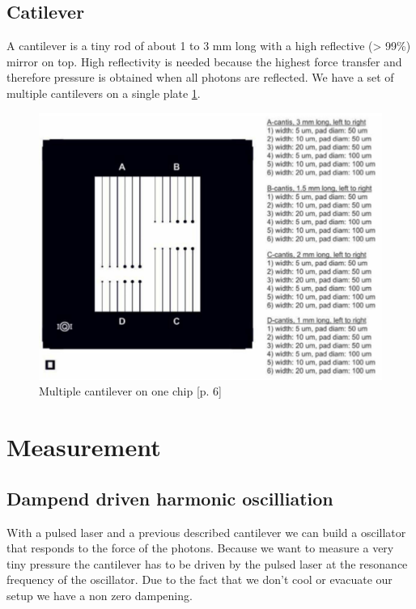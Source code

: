 \documentclass[12pt,a4paper]{article}
\begin{document}
\subsection{Catilever}
A cantilever is a tiny rod of about 1 to 3 mm long with a high reflective (> 99\%) mirror on top.
High reflectivity is needed because the highest force transfer and therefore pressure is obtained when all photons are reflected. We have a set of multiple cantilevers on a single plate \ref{fig:cantilever}.
\begin{figure}[H]
	\centering
	\includegraphics[scale=2]{../figures/cantilever.png}
	\caption{Multiple cantilever on one chip \cite{physikwiki}[p. 6]}
	\label{fig:cantilever}
\end{figure}





\pagebreak

\section{Measurement}
\subsection{Dampend driven harmonic oscilliation}
With a pulsed laser and a previous described cantilever we can build a oscillator that responds to the force of the photons. Because we want to measure a very tiny pressure the cantilever has to be driven by the pulsed laser at the resonance frequency of the oscillator. Due to the fact that we don't cool or evacuate our setup we have a non zero dampening.\\
\end{document}
